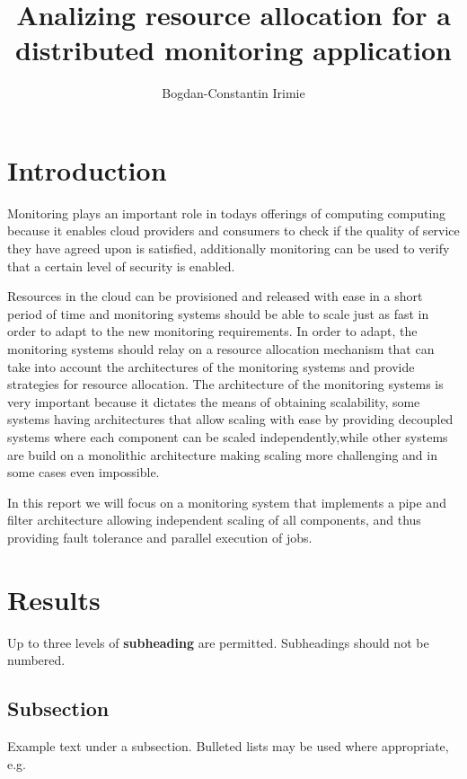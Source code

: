 \documentclass[fleqn,10pt]{./class/wlscirep}
\title{Analizing resource allocation for a distributed monitoring application}
\author[1,2,3,*]{Bogdan-Constantin Irimie}
\affil[1]{Institute e-Austria Timisoara, Romania}
\affil[2]{Department of Computer Science, West University of Timisoara, Romania}
\affil[3]{Department of Computing, Imperial College London, United Kingdon}
\affil[*]{bogdan.irimie90@e-uvt.ro}
\begin{document}
\flushbottom
\maketitle
\thispagestyle{empty}

\section*{Introduction}

Monitoring plays an important role in todays offerings of computing computing because it enables cloud providers and consumers to check if the quality of service they have agreed upon is satisfied, additionally monitoring can be used to verify that a certain level of security is enabled. 

Resources in the cloud can be provisioned and released with ease in a short period of time and monitoring systems should be able to scale just as fast in order to adapt to the new monitoring requirements. In order to adapt, the monitoring systems
should relay on a resource allocation mechanism that can take into account the architectures of the monitoring systems and provide strategies for resource allocation. The architecture of the monitoring systems is very important because it dictates the means of obtaining scalability, some systems having architectures that allow scaling with ease by providing decoupled systems where each component can be scaled independently,while other systems are build on a monolithic architecture making scaling more challenging and in some cases even impossible.

In this report we will focus on a monitoring system that implements a pipe and filter architecture allowing independent scaling of all components, and thus providing fault tolerance and parallel execution of jobs.

\section*{Results}

Up to three levels of \textbf{subheading} are permitted. Subheadings should not be numbered.

\subsection*{Subsection}

Example text under a subsection. Bulleted lists may be used where appropriate, e.g.
\end{document}
